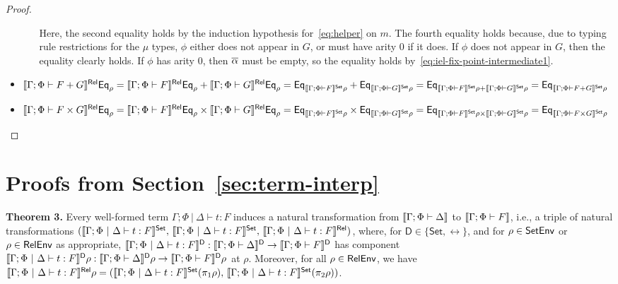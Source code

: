 \documentclass[runningheads]{llncs}
\newcommand{\set}{\mathsf{Set}}
\begin{document}
\begin{proof}
\begin{itemize}
\begin{itemize}
Here, the second equality holds by the induction hypothesis
for~\eqref{eq:helper} on $m$. The fourth equality holds because, due
to typing rule restrictions for the $\mu$ types, $\phi$ either does
not appear in $G$, or must have arity $0$ if it does. If $\phi$ does
not appear in $G$, then the equality clearly holds. If $\phi$ has
arity 0, then $\overline{\alpha}$ must be empty, so the equality holds
by~\eqref{eq:iel-fix-point-intermediate1}.
\end{itemize}
\item $\relsem{\Gamma; \Phi \vdash F + G} \Eq_{\rho} =
  \relsem{\Gamma; \Phi \vdash F} \Eq_{\rho} + \relsem{\Gamma;
    \Phi \vdash G} \Eq_{\rho} = \Eq_{\setsem{\Gamma; \Phi \vdash
      F}\rho} + \Eq_{\setsem{\Gamma; \Phi \vdash G}\rho} =
  \Eq_{\setsem{\Gamma; \Phi \vdash F}\rho + \setsem{\Gamma; \Phi
      \vdash G}\rho} = \Eq_{\setsem{\Gamma; \Phi \vdash F +
      G}\rho}$
\item $\relsem{\Gamma; \Phi \vdash F \times G} \Eq_{\rho} =
  \relsem{\Gamma; \Phi \vdash F}\Eq_{\rho} \times \relsem{\Gamma;
    \Phi \vdash G}\Eq_{\rho} = \Eq_{\setsem{\Gamma; \Phi \vdash
      F}\rho} \times \Eq_{\setsem{\Gamma; \Phi \vdash G}\rho}
  = \Eq_{\setsem{\Gamma; \Phi \vdash F}\rho \times
    \setsem{\Gamma; \Phi \vdash G}\rho} = \Eq_{\setsem{\Gamma;
      \Phi \vdash F \times G}\rho}$
\end{itemize}
\end{proof}

\section{Proofs from Section~\ref{sec:term-interp}}

\noindent
{\bf Theorem 3.}
Every well-formed term $\Gamma;\Phi~|~\Delta \vdash t : F$ induces a
natural transformation from $\llbracket{\Gamma; \Phi \vdash \Delta}\rrbracket$ to
$\llbracket{\Gamma; \Phi \vdash F}\rrbracket$, i.e., a triple of natural
transformations $(\setsem{\Gamma;\Phi~|~\Delta \vdash t : F},\,
\setsem{\Gamma;\Phi~|~\Delta \vdash t : F},\,
\relsem{\Gamma;\Phi~|~\Delta \vdash t : F})$, where, for $\mathsf D
\in \{\set,\rel\}$, and for $\rho \in \mathsf{SetEnv}$ or $\rho \in \mathsf{RelEnv}$ as
appropriate, $\llbracket{\Gamma;\Phi~|~\Delta \vdash t : F}\rrbracket^{\mathsf D} :
\llbracket{\Gamma; \Phi \vdash \Delta}\rrbracket^{\mathsf D} \to \llbracket{\Gamma; \Phi
  \vdash F}\rrbracket^{\mathsf D}$ has component $\llbracket{\Gamma;\Phi~|~\Delta
  \vdash t : F}\rrbracket^{\mathsf D}\rho : \llbracket{\Gamma; \Phi \vdash
  \Delta}\rrbracket^{\mathsf D}\rho \to \llbracket{\Gamma; \Phi \vdash F}\rrbracket^{\mathsf
  D}\rho$ at $\rho$. Moreover, for all $\rho \in \mathsf{RelEnv}$, we have
$\relsem{\Gamma;\Phi~|~\Delta \vdash t : F}\rho =
(\setsem{\Gamma;\Phi~|~\Delta \vdash t : F}(\pi_1 \rho),\,
\setsem{\Gamma;\Phi~|~\Delta \vdash t : F}(\pi_2 \rho))$.
\end{document}

